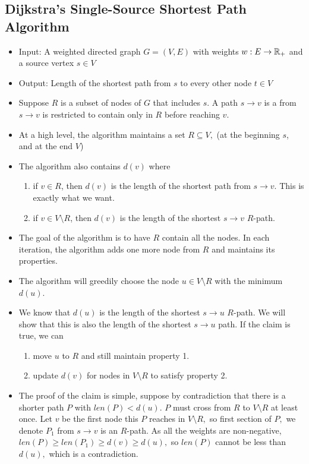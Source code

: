 \documentclass[a4paper,12pt]{article}
\begin{document}
\subsection{Dijkstra's Single-Source Shortest Path Algorithm}
\begin{itemize}
    \item Input: A weighted directed graph $G=(V,E)$ with weights $w:E\to\mathbb{R}_+$ and a source vertex $s\in V$
    \item Output: Length of the shortest path from $s$ to every other node $t\in V$
    \item Suppose $R$ is a subset of nodes of $G$ that includes $s.$ A path $s\to v$ is a  from $s\to v$ is restricted to contain only in $R$ before reaching $v.$
    \item At a high level, the algorithm maintains a set $R\subseteq V,$ (at the beginning $s$, and at the end $V$)
    \item The algorithm also contains $d(v)$ where
    \begin{enumerate}
        \item if $v\in R$, then $d(v)$ is the length of the shortest path from $s\to v.$ This is exactly what we want.
        \item if $v\in V\setminus R$, then $d(v)$ is the length of the shortest $s\to v$ $R$-path.
    \end{enumerate}
    \item The goal of the algorithm is to have $R$ contain all the nodes. In each iteration, the algorithm adds one more node from $R$ and maintains its properties.
    \item The algorithm will greedily choose the node $u\in V\setminus R$ with the minimum $d(u)$.
    \item We know that $d(u)$ is the length of the shortest $s\to u$ $R$-path. We will show that this is also the length of the shortest $s\to u$ path. If the claim is true, we can
    \begin{enumerate}[label=\alph*)]
        \item move $u$ to $R$ and still maintain property 1.
        \item update $d(v)$ for nodes in $V\setminus R$ to satisfy property 2.
    \end{enumerate}
    \item The proof of the claim is simple, suppose by contradiction that there is a shorter path $P$ with $len(P)<d(u).$ $P$ must cross from $R$ to $V\setminus R$ at least once. Let $v$ be the first node this $P$ reaches in $V\setminus R,$ so first section of $P,$ we denote $P_1$ from $s\to v$ is an $R$-path. As all the weights are non-negative, $len(P)\geq len(P_1)\geq d(v)\geq d(u),$ so $len(P)$ cannot be less than $d(u),$ which is a contradiction.

\end{itemize}
\end{document}

